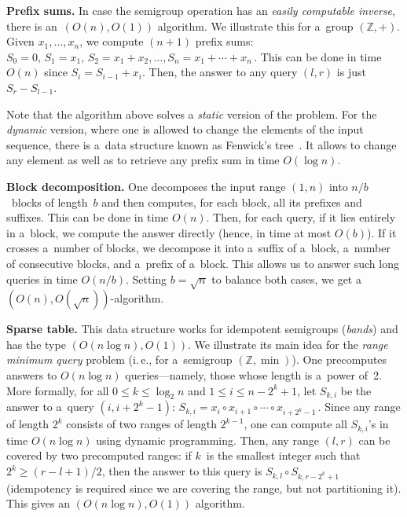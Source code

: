 \documentclass[11pt]{article}
\numberwithin{equation}{section}
\theoremstyle{definition}
\theoremstyle{plain}
\newcommand{\ie}{i.\,e.}
\theoremstyle{plain}\newtheorem{observation}[theorem]{Observation}
\begin{document}
\textbf{Prefix sums.} In case the semigroup operation has an \emph{easily
    computable inverse}, there is an~$(O(n), O(1))$ algorithm. We
illustrate this for a~group $(\mathbb{Z}, +)$. Given $x_1, \dotsc, x_n$, we
compute $(n+1)$ prefix sums:
\(S_0=0,\, S_1=x_1,\, S_2=x_1+x_2, \dotsc, S_n=x_1+\dotsb+x_n\,.\)
This can be done in time $O(n)$ since $S_i=S_{i-1}+x_i$. Then, the answer to any
query $(l,r)$ is just $S_r-S_{l-1}$.

Note that the algorithm above solves a \emph{static} version of the problem. For
the \emph{dynamic} version, where one is allowed to change the elements of the
input sequence, there is a~data structure known as Fenwick's
tree~\cite{DBLP:journals/spe/Fenwick94}. It allows to change any element as well
as to retrieve any prefix sum in time $O(\log n)$.

\textbf{Block decomposition.} One decomposes the input range $(1,n)$ into
$n/b$~blocks of length~$b$ and then computes, for each block, all its prefixes
and suffixes. This can be done in time $O(n)$. Then, for each query, if it lies
entirely in a~block, we compute the answer directly (hence, in time at most
$O(b)$). If it crosses a~number of blocks, we decompose it into a~suffix of
a~block, a~number of consecutive blocks, and a~prefix of a~block. This allows us
to answer such long queries in time $O(n/b)$. Setting $b=\sqrt{n}$ to balance
both cases, we get a~$(O(n), O(\sqrt{n}))$-algorithm.

\textbf{Sparse table.} This data structure works for idempotent semigroups
(\emph{bands}) and has the type $(O(n\log n), O(1))$. We illustrate its main idea
for the \emph{range minimum query}
problem %
(\ie, for a~semigroup
$(\mathbb{Z}, \min)$). One precomputes answers to $O(n\log n)$ queries---namely,
those whose length is a~power of~2. More formally, for all $0 \le k \le \log_2n$
and $1 \le i \le n-2^k+1$, let $S_{k,i}$ be the answer to a~query $(i, i+2^k-1)$:
\(S_{k,i}=x_i \circ x_{i+1} \circ \dotsb \circ x_{i+2^k-1} \, .\)
Since any range of length $2^k$ consists of two ranges of length $2^{k-1}$, one
can compute all $S_{k,i}$'s in time $O(n\log n)$ using dynamic programming.
Then, any range $(l,r)$ can be covered by two precomputed ranges: if $k$~is the
smallest integer such that $2^k \ge (r-l+1)/2$, then the answer to this query
is $S_{k,l} \circ S_{k,r-2^k+1}$ (idempotency is required since we are covering
the range, but not partitioning it). This gives an $(O(n\log n), O(1))$
algorithm.
\end{document}
